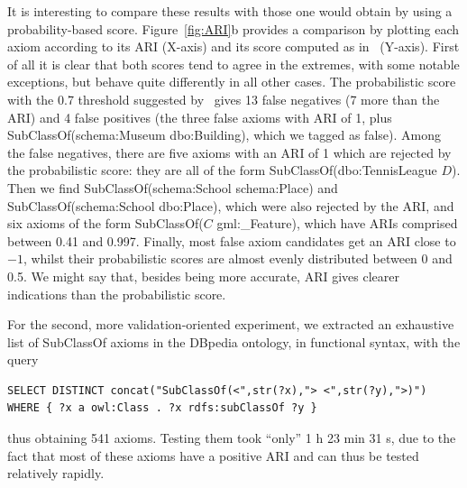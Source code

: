 \documentclass{llncs}
\begin{document}
It is interesting to compare these results with those one would obtain by using
a probability-based score. Figure~\ref{fig:ARI}b provides a comparison by plotting
each axiom according to its ARI (X-axis) and its score computed as in~\cite{BuehmannLehmann2012}
(Y-axis). First of all it is clear that both scores tend to agree in the extremes,
with some notable exceptions, but behave quite differently in all other cases.
The probabilistic score with the 0.7 threshold suggested by~\cite{BuehmannLehmann2012}
gives 13 false negatives (7 more than the ARI) and 4 false positives (the three
false axioms with ARI of 1, plus \textsf{SubClassOf(schema:Museum dbo:Building)},
which we tagged as false).
Among the false negatives, there are five axioms with an ARI of 1 which are
rejected by the probabilistic score: they are all of the form
\textsf{SubClassOf(dbo:TennisLeague $D$)}. Then we find
\textsf{SubClassOf(schema:School schema:Place)} and
\textsf{SubClassOf(schema:School dbo:Place)}, which were also rejected by the ARI,
and six axioms of the form \textsf{SubClassOf($C$ gml:\_Feature)}, which have
ARIs comprised between 0.41 and 0.997.
Finally, most false axiom candidates get an ARI close to $-1$, whilst their
probabilistic scores are almost evenly distributed between 0 and 0.5. We might
say that, besides being more accurate, ARI gives clearer indications than
the probabilistic score.

For the second, more validation-oriented experiment, we extracted an exhaustive
list of \textsf{SubClassOf} axioms in the DBpedia ontology, in functional syntax, with the query
\begin{verbatim}
SELECT DISTINCT concat("SubClassOf(<",str(?x),"> <",str(?y),">)")
WHERE { ?x a owl:Class . ?x rdfs:subClassOf ?y }\end{verbatim}
thus obtaining 541 axioms. Testing them took ``only'' 1 h 23 min 31 s, due to
the fact that most of these axioms have a positive ARI and can thus be tested
relatively rapidly.


\end{document}
